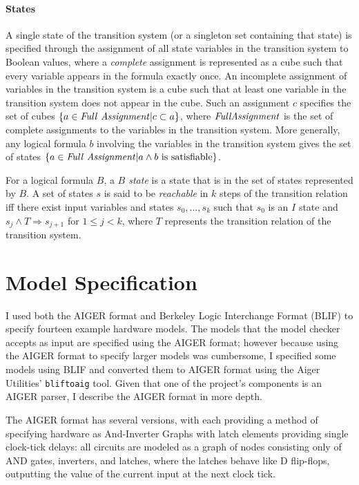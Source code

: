 \documentclass[12pt,a4paper,twoside,openright]{report}
\begin{document}
\paragraph{States}{
A single state of the transition system (or a singleton set containing that state)
is specified through the assignment of all state variables in the transition system
to Boolean values, where a \emph{complete} assignment is represented as a cube such
that every variable appears in the formula exactly once.
An incomplete assignment of variables in the transition system is a cube such that
at least one variable in the transition system does not appear in the cube. Such an
assignment $c$ specifies the set of cubes $\{a \in{\it Full~Assignment}|c \subset a\}$,
where ${\it Full Assignment}$ is the set of complete assignments to the variables in the
transition system.
More generally, any logical formula $b$ involving the variables in the transition
system gives the set of states
$\{a \in {\it Full~Assignment} | a \wedge b~{\rm is~satisfiable}\}$.

For a logical formula $B$, a \emph{$B$ state} is a state that is in the set of states
represented
by $B$. A set of states $s$ is said to be \emph{reachable}
in $k$ steps of the transition relation iff there exist input variables and
states $s_0, \ldots, s_k$ such that
$s_0$ is an $I$ state and $s_j \wedge T \Rightarrow s_{j + 1}$ for $1 \leq j < k$,
where $T$ represents the transition relation of the transition system.

}


\section{Model Specification}
\label{prep:aiger}


I used both the AIGER format and Berkeley Logic Interchange Format (BLIF)
to specify fourteen example hardware models.
The models that the model checker accepts as input
are specified using the AIGER format;
however because using the AIGER format to specify larger models was cumbersome,
I specified some models using BLIF and converted them to AIGER format
using the Aiger Utilities' \verb,bliftoaig, tool. Given that one of
the project's components is an AIGER parser, I describe the AIGER format
in more depth.

The AIGER format has several versions, with each providing
a method of specifying hardware as
And-Inverter Graphs with latch elements providing single clock-tick
delays: all circuits are modeled as a graph of nodes consisting only of
AND gates, inverters, and latches, where the latches behave like D
flip-flops, outputting the value of the current input at the next
clock tick.
\end{document}
